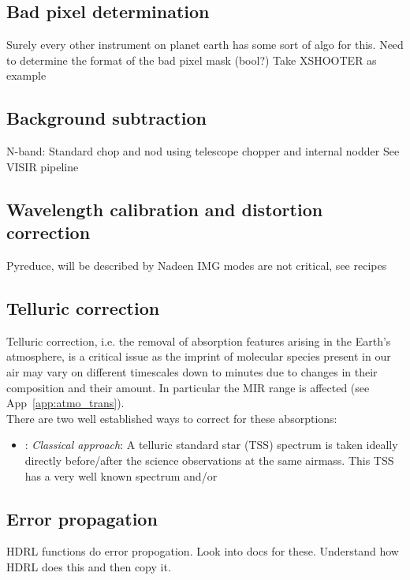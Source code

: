 \subsection{Bad pixel determination}

Surely every other instrument on planet earth has some sort of algo for this.
Need to determine the format of the bad pixel mask (bool?)
Take XSHOOTER as example

\subsection{Background subtraction}

N-band: Standard chop and nod using telescope chopper and internal nodder
See VISIR pipeline

\subsection{Wavelength calibration and distortion correction}

Pyreduce, will be described by Nadeen
IMG modes are not critical, see recipes

\subsection{Telluric correction}
Telluric correction, i.e. the removal of absorption features arising in the Earth's atmosphere, is a critical issue as the imprint of molecular species present in our air may vary on different timescales down to minutes due to changes in their composition and their amount. In particular the \ac{MIR} range is affected (see App~\ref{app:atmo_trans}).\\
There are two well established ways to correct for these absorptions:
\begin{itemize}
    \item: \textit{Classical approach}: A telluric standard star (\ac{TSS}) spectrum is taken ideally directly before/after the science observations at the same airmass. This \ac{TSS} has a very well known spectrum and/or
\end{itemize}

\subsection{Error propagation}

HDRL functions do error propogation. Look into docs for these. 
Understand how HDRL does this and then copy it.

